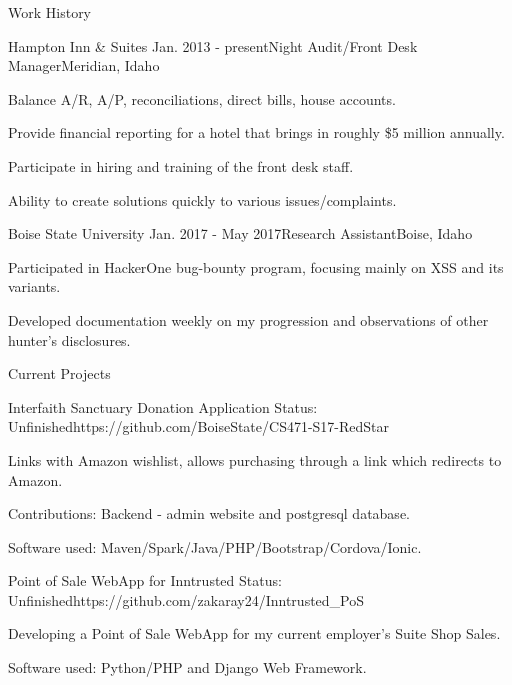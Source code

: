 \documentclass{resume}
\begin{document}
\begin{rSection}{Work History}

\begin{rSubsection}{Hampton Inn \& Suites}
{Jan. 2013 - present}{Night Audit/Front Desk Manager}{Meridian, Idaho}
\item Balance A/R, A/P, reconciliations, direct bills, house accounts.
\item Provide financial reporting for a hotel that brings in roughly \$5 million annually.
\item Participate in hiring and training of the front desk staff. 
\item Ability to create solutions quickly to various issues/complaints. 
\end{rSubsection}

\begin{rSubsection}{Boise State University}
{Jan. 2017 - May 2017}{Research Assistant}{Boise, Idaho}
\item Participated in HackerOne bug-bounty program, focusing mainly on XSS and its variants.
\item Developed documentation weekly on my progression and observations of other hunter's disclosures.
\end{rSubsection}  

\end{rSection}

\begin{rSection}{Current Projects}

\begin{rSubsection}{Interfaith Sanctuary Donation Application}
{Status: Unfinished}{https://github.com/BoiseState/CS471-S17-RedStar}{}
\item Links with Amazon wishlist, allows purchasing through a link which redirects to Amazon.
\item Contributions: Backend - admin website and postgresql database.
\item Software used: Maven/Spark/Java/PHP/Bootstrap/Cordova/Ionic.
\end{rSubsection}

\begin{rSubsection}{Point of Sale WebApp for Inntrusted}
{Status: Unfinished}{https://github.com/zakaray24/Inntrusted\_PoS}{}
\item Developing a Point of Sale WebApp for my current employer's Suite Shop Sales.
\item Software used: Python/PHP and Django Web Framework.
\end{rSubsection}

\end{rSection}
\end{document}
